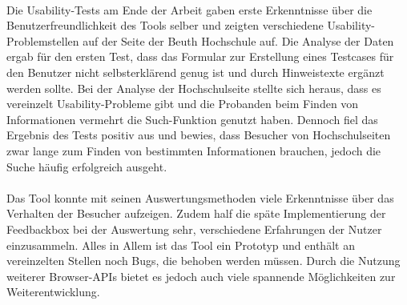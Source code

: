 \\
Die Usability-Tests am Ende der Arbeit gaben erste Erkenntnisse über die Benutzerfreundlichkeit des Tools selber und zeigten verschiedene Usability-Problemstellen auf der Seite der Beuth Hochschule auf. Die Analyse der Daten ergab für den ersten Test, dass das Formular zur Erstellung eines Testcases für den Benutzer nicht selbsterklärend genug ist und durch Hinweistexte ergänzt werden sollte. Bei der Analyse der Hochschulseite stellte sich heraus, dass es vereinzelt Usability-Probleme gibt und die Probanden beim Finden von Informationen vermehrt die Such-Funktion genutzt haben. Dennoch fiel das Ergebnis des Tests positiv aus und bewies, dass Besucher von Hochschulseiten zwar lange zum Finden von bestimmten Informationen brauchen, jedoch die Suche häufig erfolgreich ausgeht.\\
\\
Das Tool konnte mit seinen Auswertungsmethoden viele Erkenntnisse über das Verhalten der Besucher aufzeigen. Zudem half die späte Implementierung der Feedbackbox bei der Auswertung sehr, verschiedene Erfahrungen der Nutzer einzusammeln. Alles in Allem ist das Tool ein Prototyp und enthält an vereinzelten Stellen noch Bugs, die behoben werden müssen. Durch die Nutzung weiterer Browser-APIs bietet es jedoch auch viele spannende Möglichkeiten zur Weiterentwicklung.